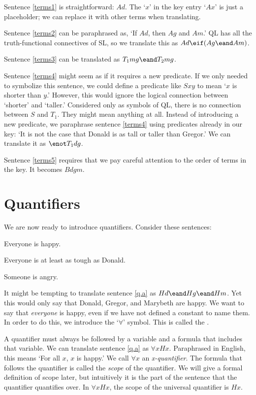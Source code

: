 Sentence \ref{terms1} is straightforward: $Ad$. The `$x$' in the key entry `$Ax$' is just a placeholder; we can replace it with other terms when translating.

Sentence \ref{terms2} can be paraphrased as, `If $Ad$, then $Ag$ and $Am$.' QL has all the truth-functional connectives of SL, so we translate this as $Ad \eif (Ag \eand Am)$.

Sentence \ref{terms3} can be translated as $T_1mg \eand T_2mg$.

Sentence \ref{terms4} might seem as if it requires a new predicate. If we only needed to symbolize this sentence, we could define a predicate like $Sxy$ to mean `$x$ is shorter than $y$.' However, this would ignore the logical connection between `shorter' and `taller.' Considered only as symbols of QL, there is no connection between $S$ and $T_1$. They might mean anything at all. Instead of introducing a new predicate, we paraphrase sentence \ref{terms4} using predicates already in our key: `It is not the case that Donald is as tall or taller than Gregor.' We can translate it as $\enot T_1dg$.

Sentence \ref{terms5} requires that we pay careful attention to the order of terms in the key. It becomes $Bdgm$.






\section{Quantifiers}
We are now ready to introduce quantifiers. Consider these sentences:
\begin{earg}
\item[\ex{q.a}] Everyone is happy.
\item[\ex{q.ac}] Everyone is at least as tough as Donald.
\item[\ex{q.e}] Someone is angry.
\end{earg}

It might be tempting to translate sentence \ref{q.a} as $Hd \eand Hg \eand Hm$. Yet this would only say that Donald, Gregor, and Marybeth are happy. We want to say that \emph{everyone} is happy, even if we have not defined a constant to name them. In order to do this, we introduce the `$\forall$' symbol. This is called the .

A quantifier must always be followed by a variable and a formula that includes that variable. We can translate sentence \ref{q.a} as $\forall x Hx$. Paraphrased in English, this means `For all $x$, $x$ is happy.'
We call $\forall x$ an \emph{x-quantifier}. The formula that follows the quantifier is called the \emph{scope} of the quantifier. We will give a formal definition of scope later, but intuitively it is the part of the sentence that the quantifier quantifies over. In $\forall x Hx$, the scope of the universal quantifier is $Hx$.

